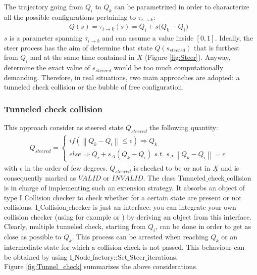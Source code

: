 The trajectory going from $Q_i$ to $Q_k$ can be parametrized in order to characterize all the possible configurations pertaining to $\tau_{i \rightarrow k}$:
\begin{eqnarray}
 Q(s) = \tau_{i \rightarrow k}(s) = Q_i + s \bigg ( Q_k - Q_i \bigg )
\label{eq:Q_composite}
\end{eqnarray}
$s$ is a parameter spanning $\tau_{i \rightarrow k}$ and can assume a value inside $[0,1]$.
Ideally, the steer process has the aim of determine that state $Q(s_{steered})$ that is furthest from $Q_i$ and at the same time contained in $\underline{X}$ (Figure \ref{fig:Steer}). Anyway, determine the exact value of $s_{steered}$ would be too much computationally demanding. Therefore, in real situations, two main approaches are adopted: a tunneled check collision or the bubble of free configuration.

\subsubsection{Tunneled check collision}

This approach consider as steered state $Q_{steered}$ the following quantity:
\begin{eqnarray}
Q_{steered} = \left\{\begin{matrix}
\textit{if} (\left \| Q_k - Q_i \right \| \leq \epsilon) \Rightarrow Q_k 
\\ 
\textit{else} \Rightarrow Q_i + s_{\Delta} ( Q_k - Q_i ) \textit{   s.t.   } s_{\Delta} \left \| Q_k - Q_i  \right \| = \epsilon
\end{matrix}\right.
\end{eqnarray}
with $\epsilon$ in the order of few degrees. $Q_{steered}$ is checked to be or not in $\underline{X}$ and is consequently marked as $VALID$ or $INVALID$. The class Tunneled$\_$check$\_$collision is in charge of implementing such an extension strategy. It absorbs an object of type I$\_$Collision$\_$checker to check whether for a certain state are present or not collisions. I$\_$Collision$\_$checker is just an interface: you can integrate your own collision checker (using for example \cite{Bullet} or \cite{React}) by deriving an object from this interface.
\\
Clearly, multiple tunneled check, starting from $Q_i$, can be done in order to get as close as possible to $Q_k$. This process can be arrested when reaching $Q_k$ or an intermediate state for which a collision check is not passed. This behaviour can be obtained by using I$\_$Node$\_$factory::Set$\_$Steer$\_$iterations.
\\
Figure \ref{fig:Tunnel_check} summarizes the above considerations.

